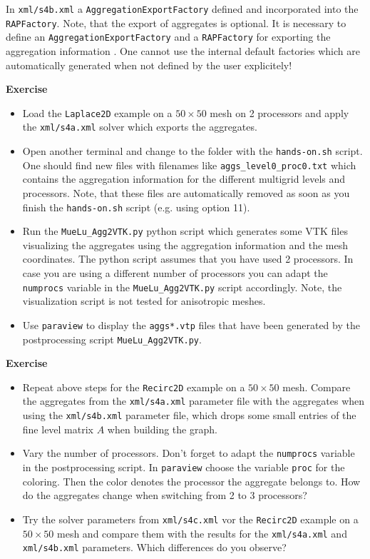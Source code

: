 \documentclass[12pt,a4paper]{article}
\begin{document}
In \verb|xml/s4b.xml| a \verb|AggregationExportFactory| defined and incorporated into the \verb|RAPFactory|. Note, that the export of aggregates is optional. It is necessary to define an \verb|AggregationExportFactory| and a \verb|RAPFactory| for exporting the aggregation information . One cannot use the internal default factories which are automatically generated when not defined by the user explicitely!

\begin{graybox}
 \textbf{Exercise}
 \begin{itemize}
  \item Load the \verb|Laplace2D| example on a $50\times 50$ mesh on 2 processors and apply the \verb|xml/s4a.xml| solver which exports the aggregates.
  \item Open another terminal and change to the folder with the \verb|hands-on.sh| script. One should find new files with  filenames like \verb|aggs_level0_proc0.txt| which contains the aggregation information for the different multigrid levels and processors. Note, that these files are automatically removed as soon as you finish the \verb|hands-on.sh| script (e.g. using option 11).
  \item Run the \verb|MueLu_Agg2VTK.py| python script which generates some VTK files visualizing the aggregates using the aggregation information and the mesh coordinates. The python script assumes that you have used 2 processors. In case you are using a different number of processors you can adapt the \verb|numprocs| variable in the \verb|MueLu_Agg2VTK.py| script accordingly. Note, the visualization script is not tested for anisotropic meshes.
  \item Use \verb|paraview| to display the \verb|aggs*.vtp| files that have been generated by the postprocessing script \verb|MueLu_Agg2VTK.py|.
 \end{itemize}
\end{graybox}

\begin{graybox}
 \textbf{Exercise}
 \begin{itemize}
  \item Repeat above steps for the \verb|Recirc2D| example on a $50\times 50$ mesh. Compare the aggregates from the \verb|xml/s4a.xml| parameter file with the aggregates when using the \verb|xml/s4b.xml| parameter file, which drops some small entries of the fine level matrix $A$ when building the graph.
  \item Vary the number of processors. Don't forget to adapt the \verb|numprocs| variable in the postprocessing script. In \verb|paraview| choose the variable \verb|proc| for the coloring. Then the color denotes the processor the aggregate belongs to. How do the aggregates change when switching from 2 to 3 processors?
  \item Try the solver parameters from \verb|xml/s4c.xml| vor the \verb|Recirc2D| example on a $50\times 50$ mesh and compare them with the results for the \verb|xml/s4a.xml| and \verb|xml/s4b.xml| parameters. Which differences do you observe?
 \end{itemize}
\end{graybox}
\end{document}
